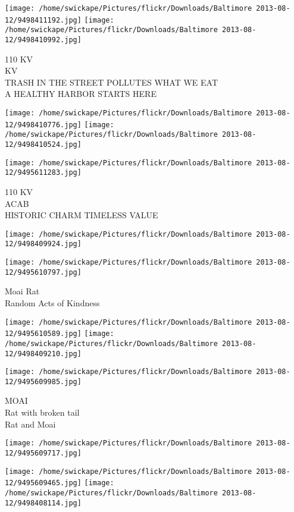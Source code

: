 \documentclass[10pt,letterpaper]{article}
\begin{document}
\texttt{[image: /home/swickape/Pictures/flickr/Downloads/Baltimore 2013-08-12/9498411192.jpg]}
\texttt{[image: /home/swickape/Pictures/flickr/Downloads/Baltimore 2013-08-12/9498410992.jpg]}

110 KV\\
KV\\
TRASH IN THE STREET POLLUTES WHAT WE EAT\\
A HEALTHY HARBOR STARTS HERE\\
\pagebreak

\texttt{[image: /home/swickape/Pictures/flickr/Downloads/Baltimore 2013-08-12/9498410776.jpg]}
\texttt{[image: /home/swickape/Pictures/flickr/Downloads/Baltimore 2013-08-12/9498410524.jpg]}

\vspace{0.25in}
\texttt{[image: /home/swickape/Pictures/flickr/Downloads/Baltimore 2013-08-12/9495611283.jpg]}

110 KV\\
ACAB\\
HISTORIC CHARM TIMELESS VALUE\\
\pagebreak

\texttt{[image: /home/swickape/Pictures/flickr/Downloads/Baltimore 2013-08-12/9498409924.jpg]}

\vspace{0.25in}
\texttt{[image: /home/swickape/Pictures/flickr/Downloads/Baltimore 2013-08-12/9495610797.jpg]}

Moai Rat\\
Random Acts of Kindness\\
\pagebreak

\texttt{[image: /home/swickape/Pictures/flickr/Downloads/Baltimore 2013-08-12/9495610589.jpg]}
\texttt{[image: /home/swickape/Pictures/flickr/Downloads/Baltimore 2013-08-12/9498409210.jpg]}

\texttt{[image: /home/swickape/Pictures/flickr/Downloads/Baltimore 2013-08-12/9495609985.jpg]}

MOAI\\
Rat with broken tail\\
Rat and Moai\\
\pagebreak

\texttt{[image: /home/swickape/Pictures/flickr/Downloads/Baltimore 2013-08-12/9495609717.jpg]}

\vspace{0.25in}
\texttt{[image: /home/swickape/Pictures/flickr/Downloads/Baltimore 2013-08-12/9495609465.jpg]}
\texttt{[image: /home/swickape/Pictures/flickr/Downloads/Baltimore 2013-08-12/9498408114.jpg]}
\end{document}
